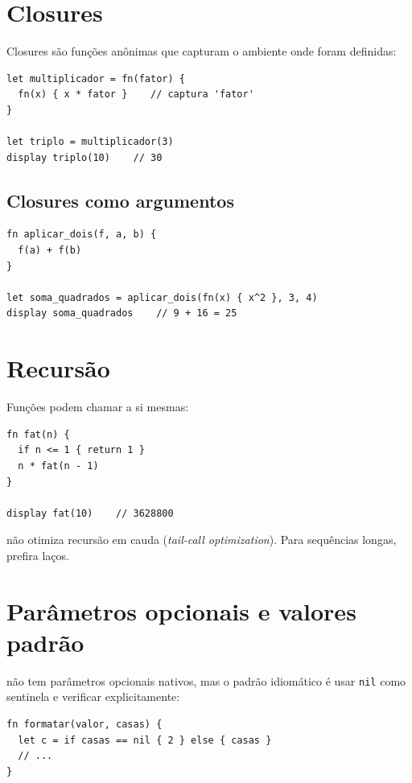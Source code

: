 \section{Closures}

Closures são funções anônimas que capturam o ambiente onde foram definidas:

\begin{lstlisting}[caption={Closure básica}]
let multiplicador = fn(fator) {
  fn(x) { x * fator }    // captura 'fator'
}

let triplo = multiplicador(3)
display triplo(10)    // 30
\end{lstlisting}

\subsection*{Closures como argumentos}

\begin{lstlisting}
fn aplicar_dois(f, a, b) {
  f(a) + f(b)
}

let soma_quadrados = aplicar_dois(fn(x) { x^2 }, 3, 4)
display soma_quadrados    // 9 + 16 = 25
\end{lstlisting}

\section{Recursão}

Funções podem chamar a si mesmas:

\begin{lstlisting}[caption={Fatorial recursivo}]
fn fat(n) {
  if n <= 1 { return 1 }
  n * fat(n - 1)
}

display fat(10)    // 3628800
\end{lstlisting}

\begin{nota}
  \hayashi{} não otimiza recursão em cauda (\textit{tail-call optimization}).
  Para sequências longas, prefira laços.
\end{nota}

\section{Parâmetros opcionais e valores padrão}

\hayashi{} não tem parâmetros opcionais nativos, mas o padrão idiomático é usar
\lstinline{nil} como sentinela e verificar explicitamente:

\begin{lstlisting}
fn formatar(valor, casas) {
  let c = if casas == nil { 2 } else { casas }
  // ...
}
\end{lstlisting}

